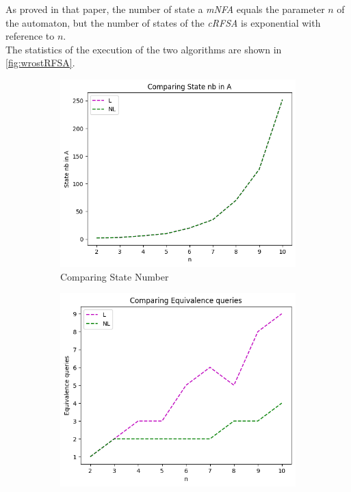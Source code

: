 As proved in that paper, the number of state a \textit{mNFA} equals the parameter $n$ of the automaton, but the number of states of the \textit{cRFSA} is exponential with reference to $n$.\\
The statistics of the execution of the two algorithms are shown in \cref{fig:wrostRFSA}.

\begin{figure}[!htb]
  \centering
  \begin{subfigure}[b]{0.3\textwidth}
    \includegraphics[width=\textwidth]{../statistics/plots/wrostRFSA/State nb in A.png}
    \caption{Comparing State Number}
    \label{fig:StateWrostRFSACompare}
  \end{subfigure}
  \begin{subfigure}[b]{0.3\textwidth}
    \includegraphics[width=\textwidth]{../statistics/plots/wrostRFSA/Equivalence queries.png}

\end{subfigure}
\end{figure}
